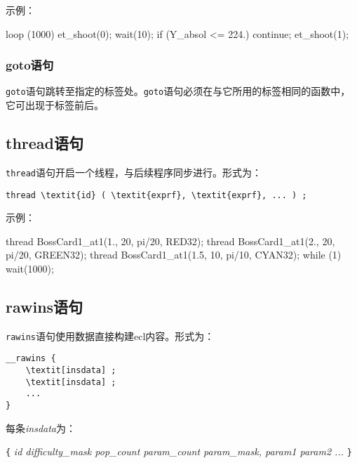 \documentclass[UTF8]{ctexart}
\begin{document}
示例：

\begin{MUAvbt}
loop (1000) {
	et_shoot(0);
	wait(10);
	if (Y_absol <= 224.)
		continue;
	et_shoot(1);
}
\end{MUAvbt}

\subsubsection{goto语句}

\verb|goto|语句跳转至指定的标签处。\verb|goto|语句必须在与它所用的标签相同的函数中，它可出现于标签前后。

\subsection{thread语句}

\verb|thread|语句开启一个线程，与后续程序同步进行。形式为：

\begin{Verbatim}[frame=single, rulecolor=\color{magenta}, commandchars=\\\{\}]
thread \textit{id} ( \textit{exprf}, \textit{exprf}, ... ) ;
\end{Verbatim}

示例：

\begin{MUAvbt}
thread BossCard1_at1(1., 20, pi/20, RED32);
thread BossCard1_at1(2., 20, pi/20, GREEN32);
thread BossCard1_at1(1.5, 10, pi/10, CYAN32);
while (1) wait(1000);
\end{MUAvbt}

\subsection{rawins语句}

\verb|rawins|语句使用数据直接构建ecl内容。形式为：

\begin{Verbatim}[frame=single, rulecolor=\color{magenta}, commandchars=\\\[\]]
__rawins {
	\textit[insdata] ;
	\textit[insdata] ;
	...
}
\end{Verbatim}

每条\textit{insdata}为：

\verb|{| \textit{id difficulty\_mask pop\_count param\_count param\_mask, param1 param2 ...} \verb|}|
\end{document}
